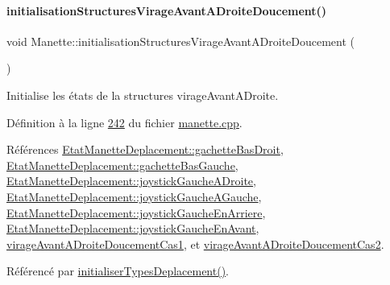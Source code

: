 \mbox{\label{class_manette_ac77d5caae62d9248edd5e26f15176f34}} 
\paragraph{\texorpdfstring{initialisation\+Structures\+Virage\+Avant\+A\+Droite\+Doucement()}{initialisationStructuresVirageAvantADroiteDoucement()}}
{\footnotesize\ttfamily void Manette\+::initialisation\+Structures\+Virage\+Avant\+A\+Droite\+Doucement (\begin{DoxyParamCaption}{ }\end{DoxyParamCaption})\hspace{0.3cm}{\ttfamily [private]}}



Initialise les états de la structures virage\+Avant\+A\+Droite. 



Définition à la ligne \hyperlink{manette_8cpp_source_l00242}{242} du fichier \hyperlink{manette_8cpp_source}{manette.\+cpp}.



Références \hyperlink{manette_8h_source_l00185}{Etat\+Manette\+Deplacement\+::gachette\+Bas\+Droit}, \hyperlink{manette_8h_source_l00184}{Etat\+Manette\+Deplacement\+::gachette\+Bas\+Gauche}, \hyperlink{manette_8h_source_l00183}{Etat\+Manette\+Deplacement\+::joystick\+Gauche\+A\+Droite}, \hyperlink{manette_8h_source_l00182}{Etat\+Manette\+Deplacement\+::joystick\+Gauche\+A\+Gauche}, \hyperlink{manette_8h_source_l00181}{Etat\+Manette\+Deplacement\+::joystick\+Gauche\+En\+Arriere}, \hyperlink{manette_8h_source_l00180}{Etat\+Manette\+Deplacement\+::joystick\+Gauche\+En\+Avant}, \hyperlink{manette_8h_source_l00237}{virage\+Avant\+A\+Droite\+Doucement\+Cas1}, et \hyperlink{manette_8h_source_l00238}{virage\+Avant\+A\+Droite\+Doucement\+Cas2}.



Référencé par \hyperlink{manette_8cpp_source_l00085}{initialiser\+Types\+Deplacement()}.


